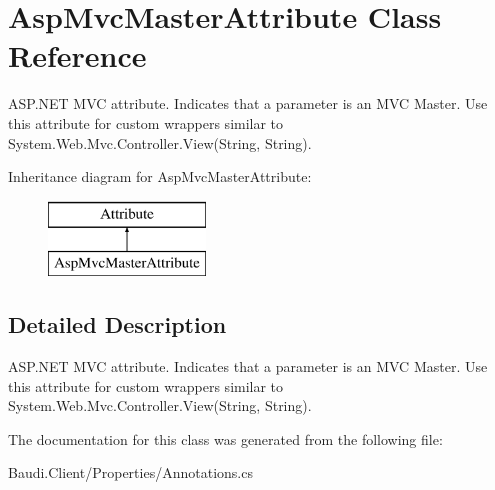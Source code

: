 \hypertarget{class_asp_mvc_master_attribute}{}\section{Asp\+Mvc\+Master\+Attribute Class Reference}
\label{class_asp_mvc_master_attribute}


A\+S\+P.\+N\+E\+T M\+V\+C attribute. Indicates that a parameter is an M\+V\+C Master. Use this attribute for custom wrappers similar to {\ttfamily System.\+Web.\+Mvc.\+Controller.\+View(\+String, String)}.  


Inheritance diagram for Asp\+Mvc\+Master\+Attribute\+:\begin{figure}[H]
\begin{center}
\leavevmode
\includegraphics[height=2.000000cm]{class_asp_mvc_master_attribute}
\end{center}
\end{figure}


\subsection{Detailed Description}
A\+S\+P.\+N\+E\+T M\+V\+C attribute. Indicates that a parameter is an M\+V\+C Master. Use this attribute for custom wrappers similar to {\ttfamily System.\+Web.\+Mvc.\+Controller.\+View(\+String, String)}. 



The documentation for this class was generated from the following file\+:\begin{DoxyCompactItemize}
\item 
Baudi.\+Client/\+Properties/Annotations.\+cs\end{DoxyCompactItemize}
